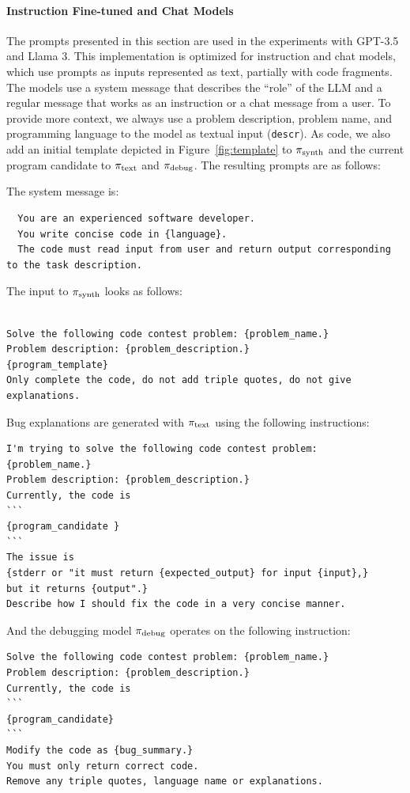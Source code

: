 \paragraph{Instruction Fine-tuned and Chat Models}
\label{sec:seidr-ollama-prompts}

The prompts presented in this section are used in the experiments with GPT-3.5 and Llama 3.
This implementation is optimized for instruction and chat models, which use prompts as inputs represented as text, partially with code fragments.
The models use a system message that describes the ``role'' of the LLM and a regular message that works as an instruction or a chat message from a user.
To provide more context, we always use a problem description, problem name, and programming language to the model as textual input (\texttt{descr}). 
As code, we also add an initial template depicted in Figure~\ref{fig:template} to $ \pi_\text{synth} $ and the current program candidate to $ \pi_\text{text} $ and $ \pi_\text{debug} $. The resulting prompts are as follows:

\newpage
The system message is: 
\begin{lstlisting}
  You are an experienced software developer.
  You write concise code in {language}.
  The code must read input from user and return output corresponding to the task description.
\end{lstlisting}

The input to $ \pi_\text{synth} $ looks as follows: 
\begin{lstlisting}

Solve the following code contest problem: {problem_name.}
Problem description: {problem_description.}
{program_template}
Only complete the code, do not add triple quotes, do not give explanations.
\end{lstlisting}

Bug explanations are generated with $ \pi_\text{text} $ using the following instructions:
\begin{lstlisting}
I'm trying to solve the following code contest problem: {problem_name.}
Problem description: {problem_description.}
Currently, the code is
```
{program_candidate }
```
The issue is 
{stderr or "it must return {expected_output} for input {input},} 
but it returns {output".}
Describe how I should fix the code in a very concise manner. 
\end{lstlisting}

And the debugging model $ \pi_\text{debug} $ operates on the following instruction:
\begin{lstlisting}
Solve the following code contest problem: {problem_name.} 
Problem description: {problem_description.} 
Currently, the code is  
```
{program_candidate} 
```
Modify the code as {bug_summary.} 
You must only return correct code.  
Remove any triple quotes, language name or explanations.
\end{lstlisting}



